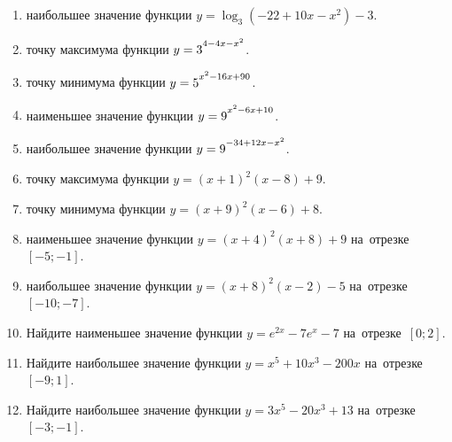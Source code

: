 \documentclass[a4paper,10pt]{article}
\begin{document}
\begin{enumerate}
\item {} наибольшее значение функции $y=\log_3\left(-22+10x-x^2\right)-3$.

\item {} точку максимума функции $y=3\strut^{4-4x-x^2}$.

\item {} точку минимума функции $y=5\strut^{x^2-16x+90}$.

\item {} наименьшее значение функции $y=9\strut^{x^2-6x+10}$.

\item {} наибольшее значение функции $y=9\strut^{-34+12x-x^2}$.

\item {} точку максимума функции $y=\left(x+1\right)^2\left(x-8\right)+9$.

\item {} точку минимума функции $y=\left(x+9\right)^2\left(x-6\right)+8$.

\item {} наименьшее значение функции $y=\left(x+4\right)^2\left(x+8\right)+9$ на~отрезке~$\left[-5;-1\right]$.

\item {} наибольшее значение функции $y=\left(x+8\right)^2\left(x-2\right)-5$ на~отрезке~$\left[-10;-7\right]$.

\item Найдите наименьшее значение функции $y=e^{2x}-7e^x-7$ на~отрезке~$\left[0;2\right]$.

\item Найдите наибольшее значение функции $y=x^5+10x^3-200x$ на~отрезке~$\left[-9;1\right]$.

\item Найдите наибольшее значение функции $y=3x^5-20x^3+13$ на~отрезке~$\left[-3;-1\right]$.

\end{enumerate}
\end{document}
